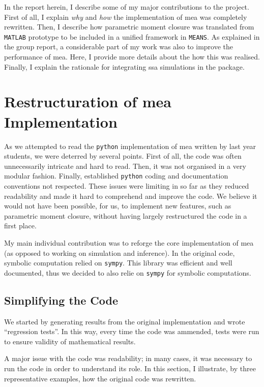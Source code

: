 \documentclass[11pt,a4paper]{article}
\newcommand{\means}{\texttt{MEANS}}
\newcommand{\py}{\texttt{python}}
\newcommand{\sympy}{\texttt{sympy}}
\newcommand{\mat}{\texttt{MATLAB}}
\newcommand{\citationneeded}[2][]{\todo[color=brown, fancyline, #1]{\textbf{Citation Needed:} #2}}
\begin{document}
In the report herein, I describe some of my major contributions to the project. 
First of all, I explain \emph{why} and \emph{how} the implementation of \acrlong{mea} was completely rewritten.
Then, I describe how parametric moment closure was translated from \mat{} prototype to be included in a unified framework in \means.
As explained in the group report, a considerable part of my work was also to improve the performance of \gls{mea}.
Here, I provide more details about the how this was realised.  
Finally, I explain the rationale for integrating \acrlong{ssa} simulations in the package. 

\section{Restructuration of \acrlong{mea} Implementation}
As we attempted to read the \py{} implementation of \acrshort{mea} written by last year students\cite{babtie_moment_2013},
we were deterred by several points.
First of all, the code was often unnecessarily intricate and hard to read.
Then, it was not organised in a very modular fashion.
Finally, established \py{} coding and documentation conventions\cite{_pep_????} not respected.
These issues were limiting in so far as they reduced readability and made it hard to comprehend and improve the code.
We believe it would not have been possible, for us, to implement new features, such as parametric moment closure,
without having largely restructured the code in a first place.

My main individual contribution was to reforge the core implementation of \acrshort{mea} (as opposed to working on simulation and inference).
In the original code, symbolic computation relied on \sympy{}\citationneeded{}.
This library was efficient and well documented, thus we decided to also relie on \sympy{} for symbolic computations.
 
\subsection{Simplifying the Code}
We started by generating results from the original implementation and wrote ``regression tests''.
In this way, every time the code was ammended, tests were run to ensure validity of mathematical results.

A major issue with the code was readability; in many cases, it was necessary to run the code in order to understand its role.
In this section, I illustrate, by three representative examples, how the original code was rewritten.
\end{document}
